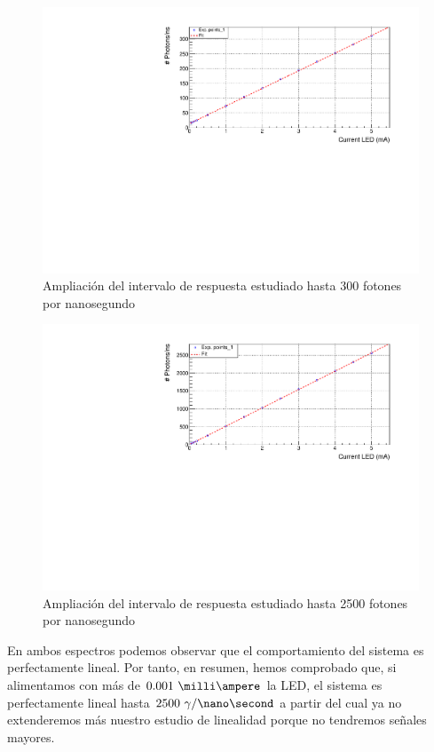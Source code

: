 \begin{figure}[H]
\centering
\includegraphics[scale=0.7]{Figuras/300.pdf}
\caption{Ampliación del intervalo de respuesta estudiado hasta 300 fotones por nanosegundo\label{300}}
\end{figure}

\begin{figure}[H]
\centering
\includegraphics[scale=0.7]{Figuras/2500.pdf}
\caption{Ampliación del intervalo de respuesta estudiado hasta 2500 fotones por nanosegundo\label{2500}}
\end{figure}

En ambos espectros podemos observar que el comportamiento del sistema es perfectamente lineal. Por tanto, en resumen, hemos comprobado que, si alimentamos con más de $0.001~\milli\ampere$ la LED, el sistema es perfectamente lineal hasta $2500~\gamma/\nano\second$ a partir del cual ya no extenderemos más nuestro estudio de linealidad porque no tendremos señales mayores. 